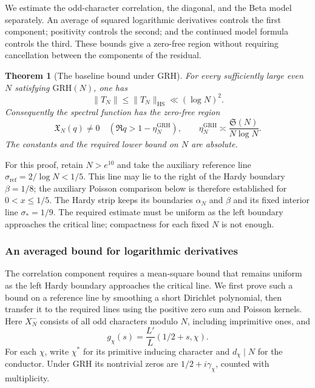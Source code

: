 \documentclass[12pt,a4paper]{amsart}
\numberwithin{equation}{section}
\def\le{\leqslant}
\theoremstyle{plain}
\newtheorem{theorem}{Theorem}[section]
\theoremstyle{definition}
\theoremstyle{remark}
\begin{document}
We estimate the odd-character correlation, the diagonal, and the
Beta model separately. An average of squared logarithmic derivatives
controls the first component; positivity controls the second; and
the continued model formula controls the third. These bounds give
a zero-free region without requiring cancellation between the
components of the residual.

\begin{theorem}[The baseline bound under GRH]\label{proof:grh:main-theorem}
For every sufficiently large even $N$ satisfying $\mathrm{GRH}(N)$,
one has
\begin{equation}\label{proof:grh:operator-bound}
 \|T_N\|\le\|T_N\|_{\mathrm{HS}}\ll(\log N)^2.
\end{equation}
Consequently the spectral function has the zero-free region
\begin{equation}\label{proof:grh:zero-free-width}
 \mathfrak X_N(q)\ne0\quad(\Re q>1-\eta_N^{\mathrm{GRH}}),
 \qquad
 \eta_N^{\mathrm{GRH}}\asymp\frac{\mathfrak S(N)}{N\log N}.
\end{equation}
The constants and the required lower bound on $N$ are absolute.
\end{theorem}

For this proof, retain $N>e^{10}$ and take the auxiliary reference line
$\sigma_{\mathrm{ref}}=2/\log N<1/5$. This line may lie to the right
of the Hardy boundary $\beta=1/8$; the auxiliary Poisson comparison
below is therefore established for $0<x\le1/5$. The Hardy strip
keeps its boundaries $\alpha_N$ and $\beta$ and its fixed interior
line $\sigma_*=1/9$.
The required estimate must be uniform as the left boundary approaches
the critical line; compactness for each fixed $N$ is not enough.

\subsubsection{An averaged bound for logarithmic derivatives}

The correlation component requires a mean-square bound that remains
uniform as the left Hardy boundary approaches the critical line.
We first prove such a bound on a reference line by smoothing a short
Dirichlet polynomial, then transfer it to the required lines using
the positive zero sum and Poisson kernels. Here $X_N^-$ consists
of all odd characters modulo $N$, including imprimitive ones, and
\[
 g_\chi(s)=\frac{L'}L(1/2+s,\chi).
\]
For each $\chi$, write $\chi^*$ for its primitive inducing character
and $d_\chi\mid N$ for the conductor. Under GRH its nontrivial
zeros are $1/2+i\gamma_\chi$, counted with multiplicity.
\end{document}
